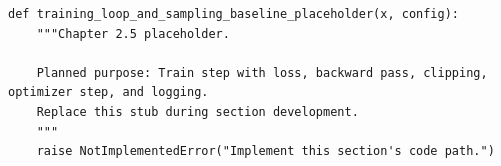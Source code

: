 \begin{lstlisting}[style=bookpython,caption={Planned code placeholder for training loop and sampling baseline.},label={lst:ch02-training-loop-and-sampling-baseline}]
def training_loop_and_sampling_baseline_placeholder(x, config):
    """Chapter 2.5 placeholder.

    Planned purpose: Train step with loss, backward pass, clipping, optimizer step, and logging.
    Replace this stub during section development.
    """
    raise NotImplementedError("Implement this section's code path.")
\end{lstlisting}
